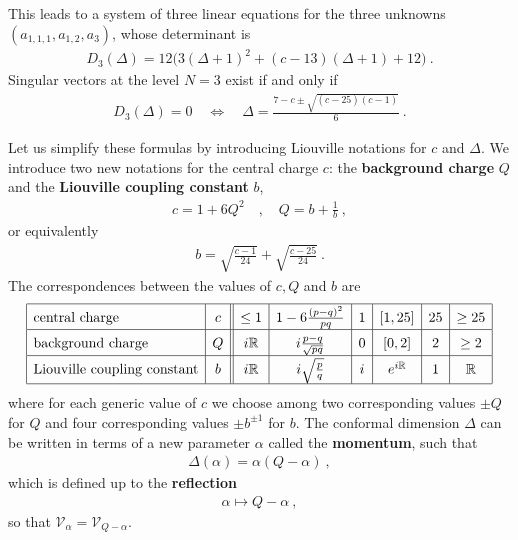 \documentclass[12pt, a4paper, notitlepage, twoside]{report}
\numberwithin{equation}{section}
\theoremstyle{break}
\begin{document}
This leads to a system of three linear equations for the three unknowns $(a_{1,1,1},a_{1,2},a_3)$, whose determinant is
\begin{align}
 D_3(\Delta) = 12\Big(3(\Delta+1)^2+(c-13)(\Delta+1)+12\Big)\ .
\end{align}
Singular vectors at the level $N=3$ exist if and only if 
\begin{align}
 D_3(\Delta) = 0 \quad \Leftrightarrow \quad \Delta = \frac{7-c\pm\sqrt{(c-25)(c-1)}}{6}\ .
\end{align}

Let us simplify these formulas by introducing Liouville notations for $c$ and $\Delta$.
We introduce two new notations for the central charge $c$: the \textbf{\boldmath background charge} $Q$ and the \textbf{\boldmath Liouville coupling constant} $b$,
\begin{align}
\boxed{ c= 1+6Q^2 }\quad , \quad \boxed{Q = b+\frac{1}{b}}\ ,
\label{cqb}
\end{align}
or equivalently
\begin{align}
 b = \sqrt{\frac{c-1}{24}} + \sqrt{\frac{c-25}{24}}\ .
\end{align}
The correspondences between the values of $c,Q$ and $b$ are 
\begin{align}
\renewcommand{\arraystretch}{1.5}
 \begin{array}{|l|c||c|c|c|c|c|c|}
  \hline
  \text{central\ charge} & c & \leq 1 & 1-6\frac{(p-q)^2}{pq} & 1 & [1,25] & 25 & \geq 25 
\\
\hline
\text{background\ charge} & Q & i{\mathbb{R}} & i\frac{p-q}{\sqrt{pq}} & 0 & [0,2] & 2 & \geq 2 
\\
\hline
\text{Liouville\ coupling\ constant} &
b& i{\mathbb{R}} & i\sqrt{\frac{p}{q}} & i & e^{i\mathbb{R}} & 1 & {\mathbb{R}}
\\
\hline
 \end{array}
\label{cqbval}
\end{align}
where for each generic value of $c$ we choose among two corresponding values $\pm Q$ for $Q$ and four corresponding values $\pm b^{\pm 1}$ for $b$.
The conformal dimension $\Delta$ can be written in terms of a 
new parameter $\alpha$ called the \textbf{\boldmath momentum}, such that 
\begin{align}
 \boxed{\Delta(\alpha) = \alpha(Q-\alpha)}\ ,
\label{daq}
\end{align}
which is defined up to the \textbf{\boldmath reflection}
\begin{align}
 \alpha \mapsto Q-\alpha\ ,
\label{arqa}
\end{align}
so that $\mathcal{V}_\alpha = \mathcal{V}_{Q-\alpha}$.
\end{document}

